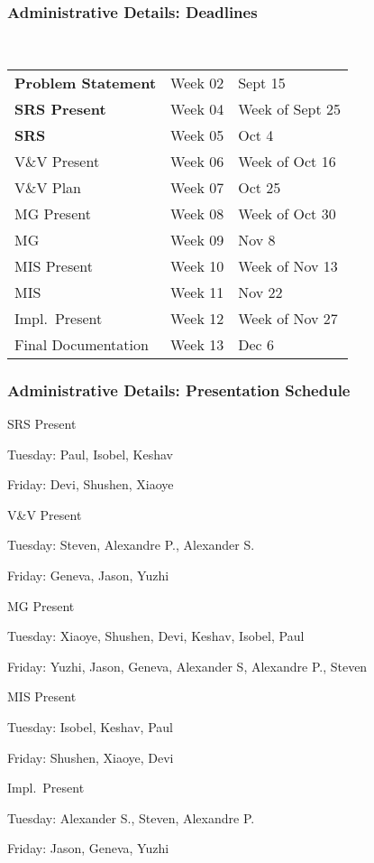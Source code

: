 \documentclass[t,12pt,numbers,fleqn]{beamer}
\begin{document}
\begin{frame}
\frametitle{Administrative Details: Deadlines}
~\newline
\begin{tabular}{l l l}
\textbf{Problem Statement} & Week 02 & Sept 15\\
\textbf{SRS Present} & Week 04 & Week of Sept 25\\
\textbf{SRS} & Week 05 & Oct 4\\
V\&V Present & Week 06 & Week of Oct 16\\
V\&V Plan & Week 07 & Oct 25\\
MG Present & Week 08 & Week of Oct 30\\
MG & Week 09 & Nov 8\\
MIS Present & Week 10 & Week of Nov 13\\
MIS & Week 11 & Nov 22\\
Impl.\ Present & Week 12 & Week of Nov 27\\
Final Documentation & Week 13 & Dec 6\\
\end {tabular}

\end{frame}


\begin{frame}
\frametitle{Administrative Details: Presentation Schedule}

\bi
\item{SRS Present}
\bi
\item Tuesday: Paul, Isobel, Keshav
\item Friday: Devi, Shushen, Xiaoye
\ei
\item V\&V Present
\bi
\item Tuesday: Steven, Alexandre P., Alexander S.
\item Friday: Geneva, Jason, Yuzhi
\ei
\item MG Present
\bi
\item Tuesday: Xiaoye, Shushen, Devi, Keshav, Isobel, Paul
\item Friday: Yuzhi, Jason, Geneva, Alexander S, Alexandre P., Steven
\ei
\item MIS Present
\bi
\item Tuesday: Isobel, Keshav, Paul
\item Friday: Shushen, Xiaoye, Devi
\ei
\item Impl.\ Present
\bi
\item Tuesday: Alexander S., Steven, Alexandre P.
\item Friday: Jason, Geneva, Yuzhi
\ei

\ei

\end{frame}
\end{document}
